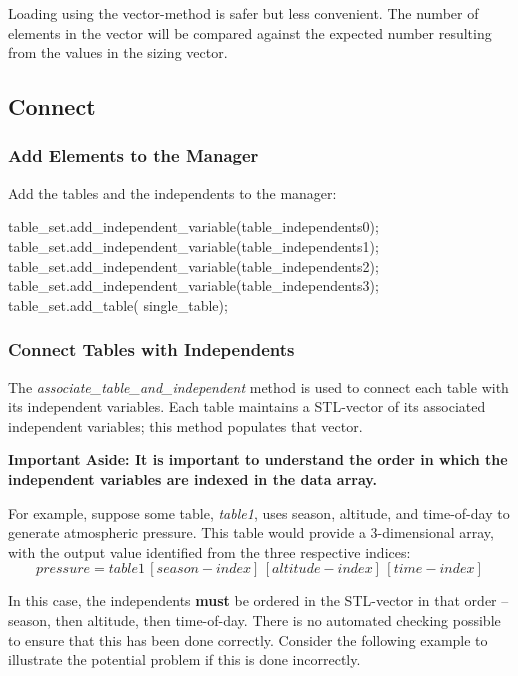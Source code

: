 \documentclass[11pt,fleqn]{report}
\begin{document}
Loading using the vector-method is safer but less convenient.  The number of
elements in the vector will be compared against the expected number resulting
from the values in the sizing vector.

\subsection{Connect}
\subsubsection{Add Elements to the Manager}
Add the tables and the independents to the manager:
\begin{code}
    table_set.add_independent_variable(table_independents0);
    table_set.add_independent_variable(table_independents1);
    table_set.add_independent_variable(table_independents2);
    table_set.add_independent_variable(table_independents3);
    table_set.add_table( single_table);
\end{code}

\subsubsection{Connect Tables with Independents}

The \textit{associate\_table\_and\_independent} method is used to connect each
 table with its independent variables.
Each table maintains a STL-vector of its associated independent variables;
this method populates that vector.

\textbf{Important Aside:  It is important to understand the order in which the
 independent variables are indexed in the data array.}

For example, suppose some table, \textit{table1}, uses season, altitude, and
 time-of-day to generate atmospheric pressure.
This table would provide a 3-dimensional array, with the output value
 identified from the three respective indices:
\begin{equation*}
 pressure = table1\,[season-index]\,[altitude-index]\,[time-index]
\end{equation*}

In this case, the independents \textbf{must} be ordered in the STL-vector in
 that order -- season, then altitude, then time-of-day.
There is no automated checking possible to ensure that this has been done
 correctly.  Consider the following example to illustrate the potential problem
 if this is done incorrectly.
\end{document}
